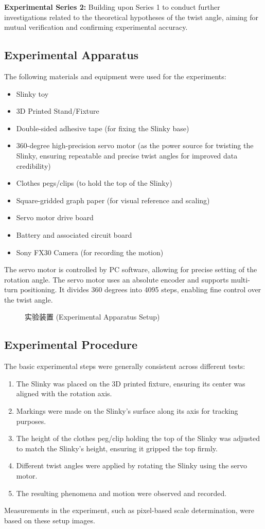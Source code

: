 \documentclass{mcmthesis}  %
\begin{document}
\textbf{Experimental Series 2:} Building upon Series 1 to conduct further investigations related to the theoretical hypotheses of the twist angle, aiming for mutual verification and confirming experimental accuracy.

\subsection{Experimental Apparatus}
The following materials and equipment were used for the experiments:
\begin{itemize}
    \item Slinky toy
    \item 3D Printed Stand/Fixture
    \item Double-sided adhesive tape (for fixing the Slinky base)
    \item 360-degree high-precision servo motor (as the power source for twisting the Slinky, ensuring repeatable and precise twist angles for improved data credibility)
    \item Clothes pegs/clips (to hold the top of the Slinky)
    \item Square-gridded graph paper (for visual reference and scaling)
    \item Servo motor drive board
    \item Battery and associated circuit board
    \item Sony FX30 Camera (for recording the motion)
\end{itemize}
The servo motor is controlled by PC software, allowing for precise setting of the rotation angle. The servo motor uses an absolute encoder and supports multi-turn positioning. It divides 360 degrees into 4095 steps, enabling fine control over the twist angle.

\begin{figure}[h!]
    \centering
    \caption{实验装置 (Experimental Apparatus Setup)}
    \label{fig:exp_apparatus}
\end{figure}

\subsection{Experimental Procedure}
The basic experimental steps were generally consistent across different tests:
\begin{enumerate}
    \item The Slinky was placed on the 3D printed fixture, ensuring its center was aligned with the rotation axis.
    \item Markings were made on the Slinky's surface along its axis for tracking purposes.
    \item The height of the clothes peg/clip holding the top of the Slinky was adjusted to match the Slinky's height, ensuring it gripped the top firmly.
    \item Different twist angles were applied by rotating the Slinky using the servo motor.
    \item The resulting phenomena and motion were observed and recorded.
\end{enumerate}
Measurements in the experiment, such as pixel-based scale determination, were based on these setup images.
\end{document}
